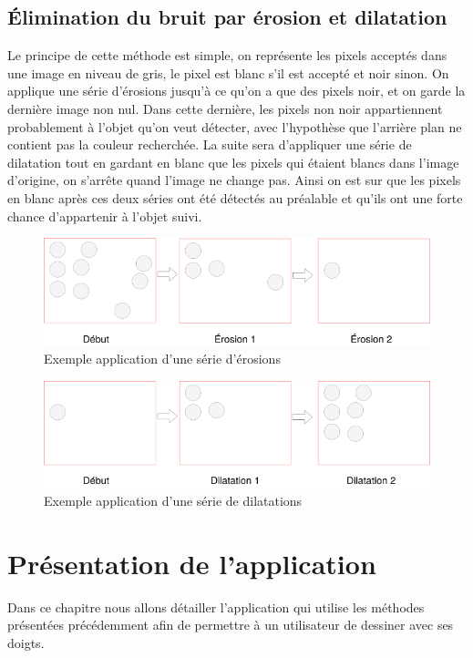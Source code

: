 \documentclass[12pt]{report}
\begin{document}
	\section{Élimination du bruit par érosion et dilatation}
	Le principe de cette méthode est simple, on représente les pixels acceptés dans une image en niveau de gris, le pixel est blanc s’il est accepté et noir sinon. On applique une série d’érosions jusqu’à ce qu’on a que des pixels noir, et on garde la dernière image non nul. Dans cette dernière, les pixels non noir appartiennent probablement à l’objet qu’on veut détecter, avec l’hypothèse que l’arrière plan ne contient pas la couleur recherchée. La suite sera d’appliquer une série de dilatation tout en gardant en blanc que les pixels qui étaient blancs dans l’image d’origine, on s’arrête quand l’image ne change pas. Ainsi on est sur que les pixels en blanc après ces deux séries ont été détectés au préalable et qu’ils ont une forte chance d’appartenir à l’objet suivi.
	\begin{figure}[H]
		\centering
		\includegraphics[scale=0.75]{imgs/erosions1.png}
		\caption{Exemple application d'une série d'érosions}
		\label{fig:Erosions}
	\end{figure}
	
	\begin{figure}[H]
		\centering
		\includegraphics[scale=0.75]{imgs/dilatations1.png}
		\caption{Exemple application d'une série de dilatations}
		\label{fig:Dilatations}
	\end{figure}
	
	\chapter{Présentation de l'application}
	Dans ce chapitre nous allons détailler l’application qui utilise les méthodes présentées précédemment afin de permettre à un utilisateur de dessiner avec ses doigts.
\end{document}
